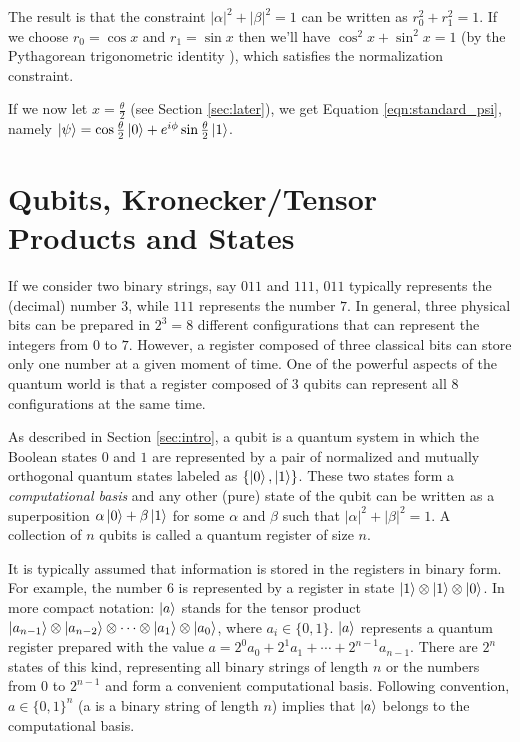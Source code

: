 \documentclass[11pt, oneside]{article}   	%
\begin{document}
\noindent
The result is that the constraint $|\alpha|^2 + |\beta|^2 = 1$ can be written as $ r_0^2 + r_1^2 = 1$.
If we choose $r_0 = \cos x$ and $r_1 = \sin x$ then we'll have $\cos^2 x+ \sin^2 x= 1$ (by the Pythagorean 
trigonometric identity \cite{wiki:trig}),  which satisfies the normalization constraint. 

\bigskip
\noindent
If we now let $x = \frac{\theta}{2}$ (see Section \ref{sec:later}), 
we get Equation \ref{eqn:standard_psi}, namely  $\ket{\psi}  = \cos \frac{\theta}{2} \ket{0} + e^{i \phi} \sin \frac{\theta}{2} \ket{1}$.

\section{Qubits, Kronecker/Tensor Products and States}

If we consider two binary strings, say $011$ and $111$,  $011$ typically represents the (decimal) number $3$, while $111$ represents the number $7$. In general, three physical bits can be prepared in 
$2^3 = 8$ different configurations that can represent the integers from $0$ to $7$. However, a register composed of three classical bits can store only one number at a given moment of time. 
One of the powerful aspects of the quantum world is that a register composed of $3$ qubits can represent all $8$ configurations at the same time.

\bigskip
\noindent
As described in Section \ref{sec:intro}, a qubit is a quantum system in which the Boolean states $0$ and $1$ are represented by a pair of normalized and mutually orthogonal quantum 
states labeled as $\{\ket{0}, \ket{1}\}$.  These two states form a \emph{computational basis} and any other (pure) state of the qubit can be written as a superposition $\alpha \ket{0} + \beta \ket{1}$
for some $\alpha$ and $\beta$ such that $|\alpha|^2 + |\beta|^2 = 1$.  A collection of $n$ qubits is called a quantum register of size $n$.

\bigskip
\noindent
It is typically assumed that information is stored in the registers in binary form. For example, the number $6$ is represented by a register in state
$\ket{1} \otimes \ket{1} \otimes \ket{0}$.  In more compact notation: $\ket{a}$ stands for the tensor product 
$\ket{a_{n-1}}  \otimes \ket{a_{n - 2}} \otimes \cdots \otimes \ket{a_1} \otimes \ket{a_0}$,  where $a_i \in \{0,1\}$.
$\ket{a}$ represents a quantum register prepared with the value $a = 2^0a_0 + 2^1 a_1 + \cdots + 2^{n - 1}a_{n-1}$.
There are $2^n$ states of this kind, representing all binary strings of length $n$ or the numbers from 0 to $2^{n - 1}$ and form a convenient computational basis. Following 
convention, $a \in \{0, 1\}^n$ (a is a binary string of length $n$) implies that $\ket{a}$ belongs to the computational basis.
\end{document}
